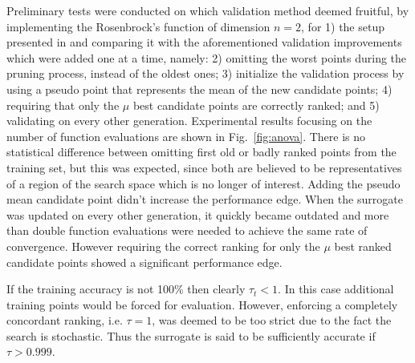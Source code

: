 \documentclass[conference]{IEEEtran}
\begin{document}
Preliminary tests were conducted on which validation method deemed fruitful, by implementing the Rosenbrock's function of dimension $n=2$, for 1) the setup presented in \cite{Ru06:PPSN} and comparing it with the aforementioned validation improvements which were added one at a time, namely: 2) omitting the worst points during the pruning process, instead of the oldest ones; 3) initialize the validation process by using a pseudo point that represents the mean of the new candidate points; 4) requiring that only the $\mu$ best candidate points are correctly ranked; and 5) validating on every other generation. 
Experimental results focusing on the number of function evaluations are shown in Fig.~\ref{fig:anova}. There is no statistical difference between omitting first old or badly ranked points from the training set, but this was expected, since both are believed to be representatives of a region of the search space which is no longer of interest. Adding the pseudo mean candidate point didn't increase the performance edge. When the surrogate was updated on every other generation, it quickly became outdated and more than double function evaluations were needed to achieve the same rate of convergence. 
However requiring the correct ranking for only the $\mu$ best ranked candidate points showed a significant performance edge. 

If the training accuracy is not 100\% then clearly $\tau_t < 1$. In this case additional training points would be forced for evaluation. However, enforcing a completely concordant ranking, i.e. $\tau=1$, was deemed to be too strict due to the fact the search is stochastic. Thus the surrogate is said to be sufficiently accurate if $\tau>0.999$. %
\end{document}
